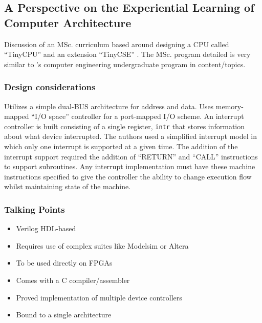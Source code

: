 \subsection{A Perspective on the Experiential Learning of Computer Architecture}

\cite{McLoughlin2010, Nakamura2013}

Discussion of an MSc. curriculum based around designing a CPU called ``TinyCPU'' \cite{McLoughlin2010} and an extension ``TinyCSE'' \cite{Nakamura2013}. The MSc. program detailed is very similar to \uwo's computer engineering undergraduate program in content/topics. 

\subsubsection{Design considerations}

Utilizes a simple dual-BUS architecture for address and data. Uses memory-mapped ``I/O space'' controller for a port-mapped I/O scheme. An interrupt controller is built consisting of a single register, \verb|intr| that stores information about what device interrupted. The authors used a simplified interrupt model in which only one interrupt is supported at a given time. The addition of the interrupt support required the addition of ``RETURN'' and ``CALL'' instructions to support subroutines. Any interrupt implementation must have these machine instructions specified to give the controller the ability to change execution flow whilst maintaining state of the machine. 


\subsubsection{Talking Points}

\begin{itemize}
    \item Verilog HDL-based
    \item Requires use of complex suites like Modelsim or Altera
    \item To be used directly on FPGAs
    \item Comes with a C compiler/assembler
    \item Proved implementation of multiple device controllers
    \item Bound to a single architecture
\end{itemize}
